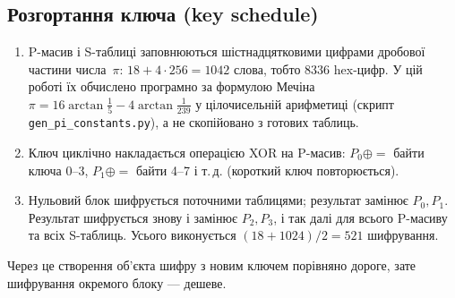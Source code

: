 \documentclass[a4paper,12pt]{article}
\begin{document}
\subsection{Розгортання ключа (key schedule)}
\begin{enumerate}
  \item P-масив і S-таблиці заповнюються шістнадцятковими цифрами дробової частини
        числа~$\pi$: $18 + 4\cdot256 = 1042$ слова, тобто 8336 hex-цифр.
        У цій роботі їх обчислено програмно за формулою Мечіна
        $\pi = 16\arctan\frac{1}{5} - 4\arctan\frac{1}{239}$
        у цілочисельній арифметиці (скрипт \texttt{gen\_pi\_constants.py}),
        а не скопійовано з готових таблиць.
  \item Ключ циклічно накладається операцією XOR на P-масив: $P_0 \oplus=$ байти ключа 0--3,
        $P_1 \oplus=$ байти 4--7 і т.\,д. (короткий ключ повторюється).
  \item Нульовий блок шифрується поточними таблицями; результат замінює $P_0, P_1$.
        Результат шифрується знову і замінює $P_2, P_3$, і так далі для всього P-масиву
        та всіх S-таблиць. Усього виконується $(18 + 1024)/2 = 521$ шифрування.
\end{enumerate}
Через це створення об'єкта шифру з новим ключем порівняно дороге, зате шифрування
окремого блоку --- дешеве.
\end{document}
